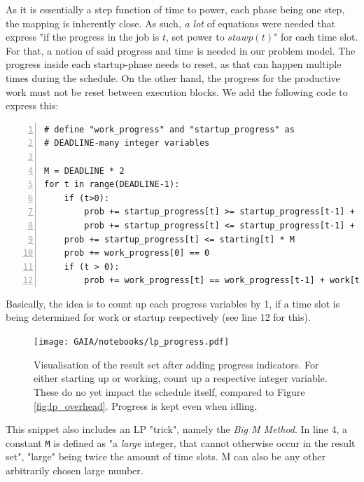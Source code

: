 As it is essentially a step function of time to power, each phase being one step, the mapping is inherently close. 
As such, \emph{a lot} of equations were needed that express "if the progress in the job is $t$, set power to $stawp(t)$" for each time slot. 
For that, a notion of said progress and time is needed in our problem model.
The progress inside each startup-phase needs to reset, as that can happen multiple times during the schedule. 
On the other hand, the progress for the productive work must not be reset between execution blocks. 
We add the following code to express this:

\begin{minipage}{\linewidth}
\begin{lstlisting}[frame=single, numbers=left, caption={Progress Variables in LP}, label={list:lp_progress}, basicstyle=\ttfamily, breaklines]
# define "work_progress" and "startup_progress" as 
# DEADLINE-many integer variables

M = DEADLINE * 2
for t in range(DEADLINE-1):
    if (t>0):
        prob += startup_progress[t] >= startup_progress[t-1] + 1 - (1 - starting[t]) * M 
        prob += startup_progress[t] <= startup_progress[t-1] + 1 + (1 - starting[t]) * M
    prob += startup_progress[t] <= starting[t] * M 
    prob += work_progress[0] == 0
    if (t > 0):
        prob += work_progress[t] == work_progress[t-1] + work[t]
\end{lstlisting}
\end{minipage}

Basically, the idea is to count up each progress variables by 1, if a time slot is being determined for work or startup respectively (see line 12 for this).

\begin{figure}[H]
    \texttt{[image: GAIA/notebooks/lp\_progress.pdf]}
    \caption{Visualisation of the result set after adding progress indicators. For either starting up or working, count up a respective integer variable. These do no yet impact the schedule itself, compared to Figure \ref{fig:lp_overhead}. Progress is kept even when idling.}
    \label{fig:lp_progress}
\end{figure}

This snippet also includes an LP "trick", namely the \emph{Big M Method}. 
In line 4, a constant \verb|M| is defined as "a \emph{large} integer, that cannot otherwise occur in the result set", "large" being twice the amount of time slots. 
M can also be any other arbitrarily chosen large number.

